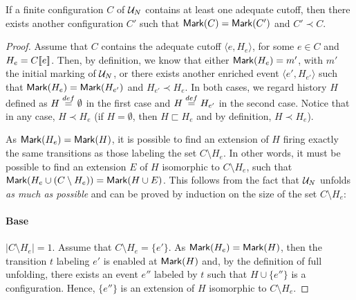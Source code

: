 \setcounter{theorem}{19}
\begin{lemma}
\label{lem:if.a}
If a finite configuration $C$ of $\mathcal{U}_{N}$ contains at least one adequate
cutoff, then there exists another configuration $C'$ such that $\mathsf{Mark }{(C)} =
\mathsf{Mark }{(C')}$ and $C' \prec C$.
\end{lemma}

\begin{proof}

Assume that $C$ contains the adequate cutoff $\langle e, H_e \rangle$, for some
$e \in C$ and $H_e = C [\![ e]\!]$.  Then, by definition, we know that either
$\mathsf{Mark }{(H_e)} = m'$, with $m'$ the initial marking of $\mathcal{U}_{N}$, or there
exists another enriched event $\langle e', H_{e'} \rangle$ such that
$\mathsf{Mark }{(H_e)} = \mathsf{Mark }{(H_{e'})}$ and $H_{e'} \prec H_e$.  In both cases, we
regard history $H$ defined as $H \stackrel{def}{=} \emptyset$ in the first case and $H
\stackrel{def}{=} H_{e'}$ in the second case.  Notice that in any case, $H \prec H_e$
(if $H = \emptyset$, then $H \sqsubset H_e$ and by definition, $H \prec H_e$).

As $\mathsf{Mark }{(H_e)} = \mathsf{Mark }{(H)}$, it is possible to find an extension of $H$
firing exactly the same transitions as those labeling the set $C \setminus
H_e$.  In other words, it must be possible to find an extension $E$ of $H$
isomorphic to $C \setminus H_e$, such that $\mathsf{Mark }{(H_e \cup (C \setminus
H_e))} = \mathsf{Mark }{(H \cup E)}$.  This follows from the fact that $\mathcal{U}_{N}$ unfolds
\emph{as much as possible} and can be proved by induction on the size of the
set $C \setminus H_e$:

\paragraph{Base}  $|C \setminus H_e| = 1$.  Assume that $C \setminus H_e =
\{e'\}$.  As $\mathsf{Mark }{(H_e)} = \mathsf{Mark }{(H)}$, then the transition $t$ labeling
$e'$ is enabled at $\mathsf{Mark }{(H)}$ and, by the definition of full unfolding,
there exists an event $e''$ labeled by $t$ such that $H \cup \{e''\}$ is a
configuration.  Hence, $\{e''\}$ is an extension of $H$ isomorphic to $C
\setminus H_e$.


\end{proof}

